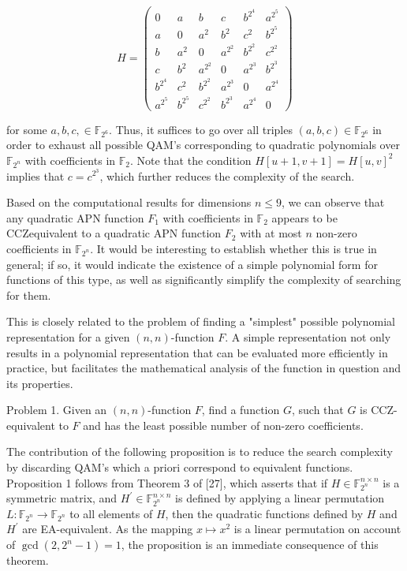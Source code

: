 \documentclass[10pt]{article}
\begin{document}
$$
H=\left(\begin{array}{cccccc}
0 & a & b & c & b^{2^{4}} & a^{2^{5}} \\
a & 0 & a^{2} & b^{2} & c^{2} & b^{2^{5}} \\
b & a^{2} & 0 & a^{2^{2}} & b^{2^{2}} & c^{2^{2}} \\
c & b^{2} & a^{2^{2}} & 0 & a^{2^{3}} & b^{2^{3}} \\
b^{2^{4}} & c^{2} & b^{2^{2}} & a^{2^{3}} & 0 & a^{2^{4}} \\
a^{2^{5}} & b^{2^{5}} & c^{2^{2}} & b^{2^{3}} & a^{2^{4}} & 0
\end{array}\right)
$$

for some $a, b, c, \in \mathbb{F}_{2^{6}}$. Thus, it suffices to go over all triples $(a, b, c) \in \mathbb{F}_{2^{6}}$ in order to exhaust all possible QAM's corresponding to quadratic polynomials over $\mathbb{F}_{2^{n}}$ with coefficients in $\mathbb{F}_{2}$. Note that the condition $H[u+1, v+1]=H[u, v]^{2}$ implies that $c=c^{2^{3}}$, which further reduces the complexity of the search.

Based on the computational results for dimensions $n \leq 9$, we can observe that any quadratic APN function $F_{1}$ with coefficients in $\mathbb{F}_{2}$ appears to be CCZequivalent to a quadratic APN function $F_{2}$ with at most $n$ non-zero coefficients in $\mathbb{F}_{2^{n}}$. It would be interesting to establish whether this is true in general; if so, it would indicate the existence of a simple polynomial form for functions of this type, as well as significantly simplify the complexity of searching for them.

This is closely related to the problem of finding a "simplest" possible polynomial representation for a given $(n, n)$-function $F$. A simple representation not only results in a polynomial representation that can be evaluated more efficiently in practice, but facilitates the mathematical analysis of the function in question and its properties.

Problem 1. Given an $(n, n)$-function $F$, find a function $G$, such that $G$ is CCZ-equivalent to $F$ and has the least possible number of non-zero coefficients.

The contribution of the following proposition is to reduce the search complexity by discarding QAM's which a priori correspond to equivalent functions. Proposition 1 follows from Theorem 3 of [27], which asserts that if $H \in \mathbb{F}_{2^{n}}^{n \times n}$ is a symmetric matrix, and $H^{\prime} \in \mathbb{F}_{2^{n}}^{n \times n}$ is defined by applying a linear permutation $L: \mathbb{F}_{2^{n}} \rightarrow \mathbb{F}_{2^{n}}$ to all elements of $H$, then the quadratic functions defined by $H$ and $H^{\prime}$ are EA-equivalent. As the mapping $x \mapsto x^{2}$ is a linear permutation on account of $\operatorname{gcd}\left(2,2^{n}-1\right)=1$, the proposition is an immediate consequence of this theorem.
\end{document}
